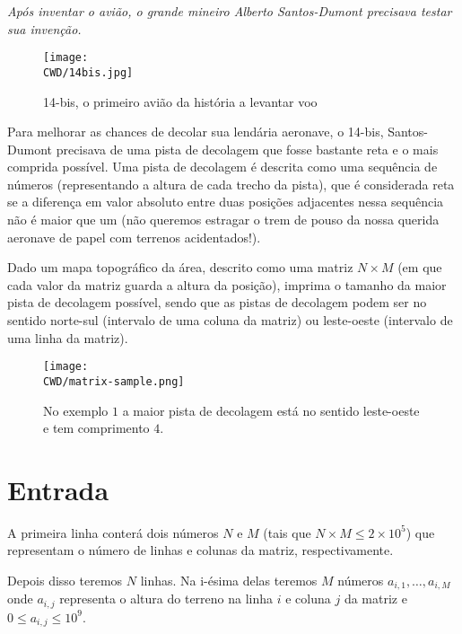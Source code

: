 %

\begin{center}
\textit{Após inventar o avião, o grande mineiro Alberto Santos-Dumont precisava testar sua invenção.}
\end{center}

\begin{figure}[H]
  \centering
  \texttt{[image: \\CWD/14bis.jpg]}
  \caption{14-bis, o primeiro avião da história a levantar voo}
\end{figure}

Para melhorar as chances de decolar sua lendária aeronave, o 14-bis, Santos-Dumont precisava de uma pista de decolagem que fosse bastante reta e o mais comprida possível. Uma pista de decolagem é descrita como uma sequência de números (representando a altura de cada trecho da pista), que é considerada reta se a diferença em valor absoluto entre duas posições adjacentes nessa sequência não é maior que um (não queremos estragar o trem de pouso da nossa querida aeronave de papel com terrenos acidentados!).

Dado um mapa topográfico da área, descrito como uma matriz $N\times M$ (em que cada valor da matriz guarda a altura da posição), imprima o tamanho da maior pista de decolagem possível, sendo que as pistas de decolagem podem ser no sentido norte-sul (intervalo de uma coluna da matriz) ou leste-oeste (intervalo de uma linha da matriz).

\begin{figure}[H]
  \centering
  \texttt{[image: \\CWD/matrix-sample.png]}
  \caption{No exemplo $1$ a maior pista de decolagem está no sentido leste-oeste e tem comprimento $4$.}
\end{figure}
%
%
\section*{Entrada}

A primeira linha conterá dois números $N$ e $M$ (tais que $N \times M \leq 2\times 10^5$) que representam o número de linhas e colunas da matriz, respectivamente.

Depois disso teremos $N$ linhas. Na i-ésima delas teremos $M$ números $a_{i, 1}, \ldots, a_{i, M}$ onde $a_{i, j}$ representa o altura do terreno na linha $i$ e coluna $j$ da matriz e $0 \leq a_{i, j} \leq 10^9$.

